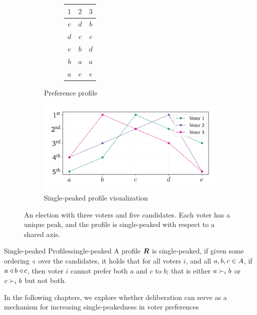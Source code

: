 \begin{figure}[ht]
	\centering
	\begin{subfigure}[b]{0.3\textwidth}
		\centering
		\begin{subfigure}[b]{0.3\textwidth}
			\centering
			\begin{tabular}{ccc}
				\toprule
				$1$ & $2$ & $3$ \\
				\midrule
				$c$ & $d$ & $b$ \\
				$d$ & $c$ & $c$ \\
				$e$ & $b$ & $d$ \\
				$b$ & $a$ & $a$ \\
				$a$ & $e$ & $e$ \\
				\bottomrule
			\end{tabular}
			\vspace{2.8em}
		\end{subfigure}
		\caption{Preference profile}\label{tab:corresponding_profile}
	\end{subfigure}
	\hfill
	\begin{subfigure}[b]{0.65\textwidth}
		\centering
		\includegraphics[width=\textwidth]{Figures/single_peak_vis.png}
		\caption{Single-peaked profile visualization}\label{fig:singlepeaked_vis}
	\end{subfigure}
	\caption{An election with three voters and five candidates. Each voter has a unique peak, and the profile is single-peaked with respect to a shared axis.}
	\label{fig:singlepeaked_full}
\end{figure}
\begin{definition}{Single-peaked Profiles}{single-peaked}
	A profile $\boldsymbol{R}$ is single-peaked, if given some ordering
	$\triangleleft$ over the candidates, it holds that for all voters $i$, and
	all $a, b, c \in A$, if $a \triangleleft b \triangleleft c$, then
	voter $i$ cannot prefer both $a$ and $c$ to $b$; that is either $a
		\succ_i b$ or $c\succ_i b$ but not both.
\end{definition}


In the following chapters, we explore whether deliberation can serve as a
mechanism for increasing single-peakedness in voter preferences

